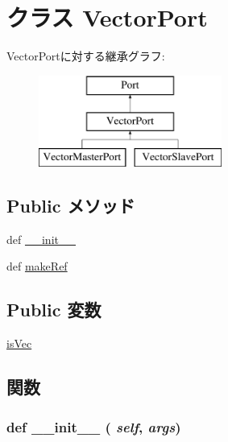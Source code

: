 \hypertarget{classm5_1_1params_1_1VectorPort}{
\section{クラス VectorPort}
\label{classm5_1_1params_1_1VectorPort}
}
VectorPortに対する継承グラフ:\begin{figure}[H]
\begin{center}
\leavevmode
\includegraphics[height=3cm]{classm5_1_1params_1_1VectorPort}
\end{center}
\end{figure}
\subsection*{Public メソッド}
\begin{DoxyCompactItemize}
\item 
def \hyperlink{classm5_1_1params_1_1VectorPort_ac775ee34451fdfa742b318538164070e}{\_\-\_\-init\_\-\_\-}
\item 
def \hyperlink{classm5_1_1params_1_1VectorPort_a0170489846d992db3fea03df9156216b}{makeRef}
\end{DoxyCompactItemize}
\subsection*{Public 変数}
\begin{DoxyCompactItemize}
\item 
\hyperlink{classm5_1_1params_1_1VectorPort_a7af47132c5fb2b2cc33a809a92e51553}{isVec}
\end{DoxyCompactItemize}


\subsection{関数}
\hypertarget{classm5_1_1params_1_1VectorPort_ac775ee34451fdfa742b318538164070e}{
\subsubsection[{\_\-\_\-init\_\-\_\-}]{\setlength{\rightskip}{0pt plus 5cm}def \_\-\_\-init\_\-\_\- ( {\em self}, \/   {\em args})}}
\label{classm5_1_1params_1_1VectorPort_ac775ee34451fdfa742b318538164070e}


